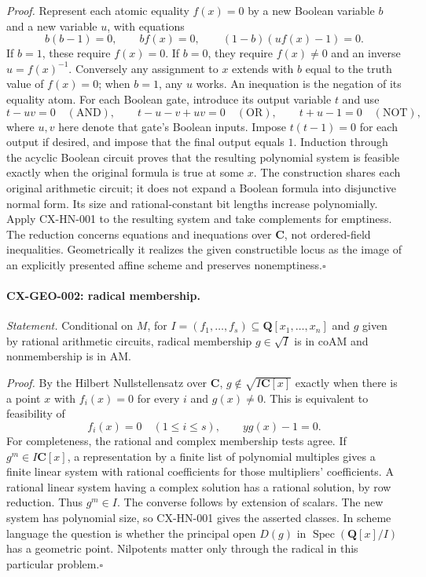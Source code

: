 \documentclass[11pt,a4paper]{article}
\begin{document}
\emph{Proof.} Represent each atomic equality $f(x)=0$ by a new Boolean
variable $b$ and a new variable $u$, with equations
\[
 b(b-1)=0,\qquad bf(x)=0,\qquad (1-b)(u f(x)-1)=0.
\]
If $b=1$, these require $f(x)=0$. If $b=0$, they require $f(x)\ne0$
and an inverse $u=f(x)^{-1}$. Conversely any assignment to $x$ extends
with $b$ equal to the truth value of $f(x)=0$; when $b=1$, any $u$ works.
An inequation is the negation of its equality atom.
For each Boolean gate, introduce its output variable $t$ and use
\[
 t-uv=0\quad(\mathrm{AND}),\qquad
 t-u-v+uv=0\quad(\mathrm{OR}),\qquad
 t+u-1=0\quad(\mathrm{NOT}),
\]
where $u,v$ here denote that gate's Boolean inputs. Impose $t(t-1)=0$
for each output if desired, and impose that the final output equals $1$.
Induction through the acyclic Boolean circuit proves that the resulting
polynomial system is feasible exactly when the original formula is true
at some $x$. The construction shares each original arithmetic circuit;
it does not expand a Boolean formula into disjunctive normal form.
Its size and rational-constant bit lengths increase polynomially.
Apply CX-HN-001 to the resulting system and take complements for emptiness.
The reduction concerns equations and inequations over $\mathbf C$, not
ordered-field inequalities. Geometrically it realizes the given constructible
locus as the image of an explicitly presented affine scheme and preserves
nonemptiness.\hfill$\square$

\paragraph{CX-GEO-002: radical membership.}
\emph{Statement.} Conditional on $M$, for
$I=(f_1,\ldots,f_s)\subseteq\mathbf Q[x_1,\ldots,x_n]$ and $g$ given
by rational arithmetic circuits, radical membership $g\in\sqrt I$ is in
$\mathrm{coAM}$ and nonmembership is in $\mathrm{AM}$.

\emph{Proof.} By the Hilbert Nullstellensatz over $\mathbf C$,
$g\notin\sqrt{I\mathbf C[x]}$ exactly when there is a point $x$ with
$f_i(x)=0$ for every $i$ and $g(x)\ne0$. This is equivalent to feasibility of
\[
               f_i(x)=0\quad(1\leq i\leq s),\qquad y g(x)-1=0.
\]
For completeness, the rational and complex membership tests agree. If
$g^m\in I\mathbf C[x]$, a representation by a finite list of polynomial
multiples gives a finite linear system with rational coefficients for those
multipliers' coefficients. A rational linear system having a complex solution
has a rational solution, by row reduction. Thus $g^m\in I$. The converse
follows by extension of scalars. The new system has polynomial size, so
CX-HN-001 gives the asserted classes. In scheme language the question is
whether the principal open $D(g)$ in $\operatorname{Spec}(\mathbf Q[x]/I)$
has a geometric point. Nilpotents matter only through the radical in this
particular problem.\hfill$\square$
\end{document}

